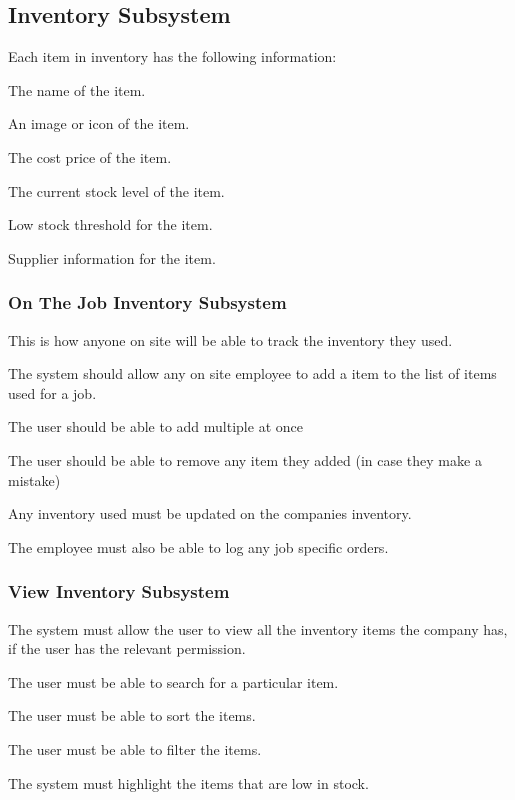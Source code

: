 \documentclass{article}
\begin{document}
	\subsection*{Inventory Subsystem}
	\begin{list}{R.}{}
		\item Each item in inventory has the following information:
		\begin{list}{R.}{}
			\item The name of the item. 
			\item An image or icon of the item.
			\item The cost price of the item.
			\item The current stock level of the item.
			\item Low stock threshold for the item.
			\item Supplier information for the item. 
		\end{list}
	\end{list}
	\subsubsection*{On The Job Inventory Subsystem}	
	\begin{list}{R.}{}
		\item This is how anyone on site will be able to track the inventory they used.
		\item The system should allow any on site employee to add a item to the list of items used for a job. 
		\item The user should be able to add multiple at once 
		\item The user should be able to remove any item they added (in case they make a mistake)
		\item Any inventory used must be updated on the companies inventory.
		\item The employee must also be able to log any job specific orders.
	\end{list}
	\subsubsection*{View Inventory Subsystem}	
	\begin{list}{R.}{}
		\item The system must allow the user to view all the inventory items the company has, if the user has the relevant permission.
		\begin{list}{R.}{}
			\item The user must be able to search for a particular item.
			\item The user must be able to sort the items.
			\item The user must be able to filter the items.
		\end{list}
		\item The system must highlight the items that are low in stock.
	\end{list}
\end{document}
